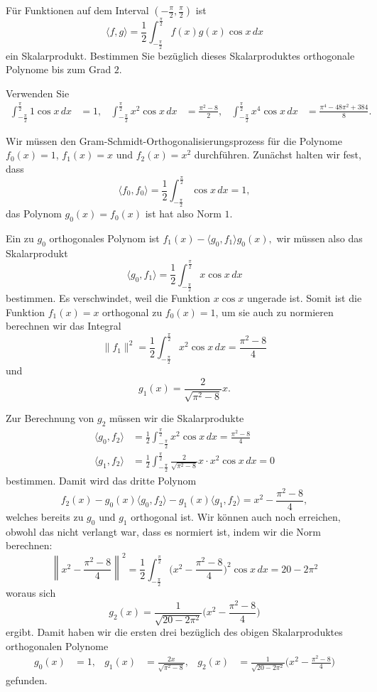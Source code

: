 Für Funktionen auf dem Interval $(-\frac{\pi}2,\frac{\pi}2)$ ist
\[
\langle f,g\rangle
=
\frac12\int_{-\frac{\pi}2}^{\frac{\pi}2} f(x)g(x)\cos x\,dx
\]
ein Skalarprodukt.
Bestimmen Sie bezüglich dieses Skalarproduktes orthogonale Polynome
bis zum Grad $2$.

\begin{hinweis}
Verwenden Sie
\begin{align*}
\int_{-\frac{\pi}2}^{\frac{\pi}2} 1\cos x\,dx
&=
1,
&
\int_{-\frac{\pi}2}^{\frac{\pi}2} x^2\cos x\,dx
&=
\frac{\pi^2-8}{2},
&
\int_{-\frac{\pi}2}^{\frac{\pi}2} x^4\cos x\,dx
&=
\frac{\pi^4-48\pi^2+384}{8}.
\end{align*}
\end{hinweis}

\begin{loesung}
Wir müssen den Gram-Schmidt-Orthogonalisierungsprozess für die
Polynome $f_0(x)=1$, $f_1(x)=x$ und $f_2(x)=x^2$ durchführen.
Zunächst halten wir fest, dass
\[
\langle f_0,f_0\rangle
=
\frac12
\int_{-\frac{\pi}2}^{\frac{\pi}2} \cos x\,dx
=
1,
\]
das Polynom $g_0(x)=f_0(x)$ ist hat also Norm $1$.

Ein zu $g_0$ orthogonales Polynom ist
\(
f_1(x) - \langle g_0,f_1\rangle g_0(x),
\)
wir müssen also das Skalarprodukt
\[
\langle g_0,f_1\rangle
=
\frac{1}{2}
\int_{-\frac{\pi}2}^{\frac{\pi}2}
x\cos x\,dx
\]
bestimmen.
Es verschwindet, weil die Funktion $x\cos x$ ungerade ist.
Somit ist die Funktion $f_1(x)=x$ orthogonal zu $f_0(x)=1$, um sie auch zu
normieren berechnen wir das Integral
\[
\| f_1\|^2
=
\frac12\int_{-\frac{\pi}2}^{\frac{\pi}2} x^2\cos x\,dx
=
\frac{\pi^2-8}{4}
\]
und 
\[
g_1(x)
=
\frac{2}{\sqrt{\pi^2-8}} x.
\]

Zur Berechnung von $g_2$ müssen wir die Skalarprodukte
\begin{align*}
\langle g_0,f_2\rangle
&=
\frac{1}{2}
\int_{-\frac{\pi}2}^{\frac{\pi}2}
x^2
\cos x
\,dx
=
\frac{\pi^2-8}{4}
\\
\langle g_1,f_2\rangle
&=
\frac{1}{2}
\int_{-\frac{\pi}2}^{\frac{\pi}2}
\frac{2}{\sqrt{\pi^2-8}}
x
\cdot x^2
\cos x
\,dx
=
0
\end{align*}
bestimmen.
Damit wird das dritte Polynom
\[
f_2(x)
- g_0(x)\langle g_0,f_2\rangle
- g_1(x)\langle g_1,f_2\rangle
=
x^2 - \frac{\pi^2-8}{4},
\]
welches bereits zu $g_0$ und $g_1$ orthogonal ist.
Wir können auch noch erreichen, obwohl das nicht verlangt war,
dass es normiert ist, indem wir die Norm berechnen:
\[
\left\| x^2-\frac{\pi^2-8}{4} \right\|^2
=
\frac12
\int_{-\frac{\pi}2}^{\frac{\pi}2}
\biggl(x^2-\frac{\pi^2-8}{4}\biggr)^2
\cos x\,dx
=
20-2\pi^2
\]
woraus sich
\[
g_2(x)
=
\frac{1}{\sqrt{20-2\pi^2}}
\biggl(
x^2 - \frac{\pi^2-8}{4}
\biggr)
\]
ergibt.
Damit haben wir die ersten drei bezüglich des obigen Skalarproduktes
orthogonalen Polynome
\begin{align*}
g_0(x)&=1,
&
g_1(x)&=\frac{2x}{\sqrt{\pi^2-8}},
&
g_2(x)&=\frac{1}{\sqrt{20-2\pi^2}}\biggl(x^2-\frac{\pi^2-8}{4}\biggr)
\end{align*}
gefunden.
\end{loesung}
